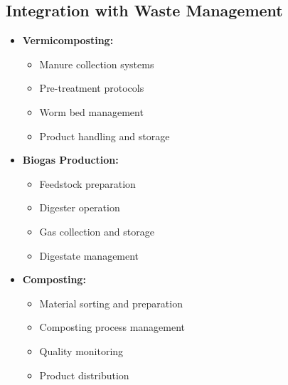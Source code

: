 \subsection{Integration with Waste Management}
\begin{itemize}
    \item \textbf{Vermicomposting:}
    \begin{itemize}
        \item Manure collection systems
        \item Pre-treatment protocols
        \item Worm bed management
        \item Product handling and storage
    \end{itemize}
    
    \item \textbf{Biogas Production:}
    \begin{itemize}
        \item Feedstock preparation
        \item Digester operation
        \item Gas collection and storage
        \item Digestate management
    \end{itemize}
    
    \item \textbf{Composting:}
    \begin{itemize}
        \item Material sorting and preparation
        \item Composting process management
        \item Quality monitoring
        \item Product distribution
    \end{itemize}
\end{itemize}

